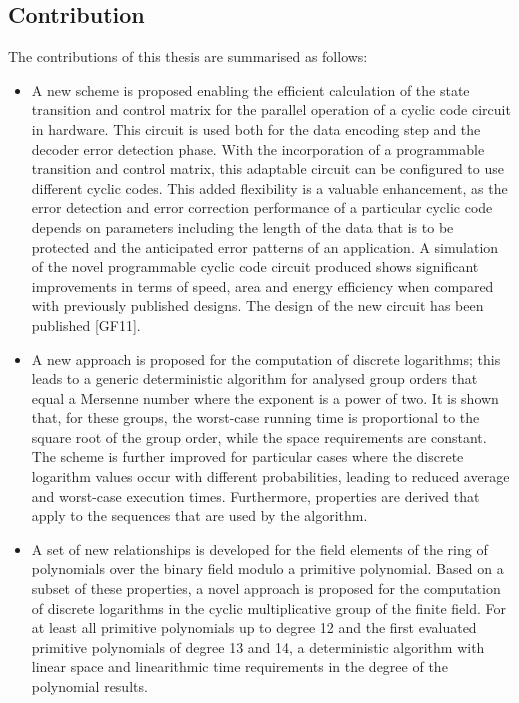 \documentclass[a4paper, 11pt]{article}
\begin{document}
\subsection{Contribution}
The contributions of this thesis are summarised as follows:

\begin{itemize}
\item A new scheme is proposed enabling the efficient calculation of the state transition and control matrix for the parallel operation of a cyclic code circuit in hardware. This circuit is used both for the data encoding step and the decoder error detection phase. With the incorporation of a programmable transition and control matrix, this adaptable circuit can be configured to use different cyclic codes. This added flexibility is a valuable enhancement, as the error detection and error correction performance of a particular cyclic code depends on parameters including the length of the data that is to be protected and the anticipated error patterns of an application. A simulation of the novel programmable cyclic code circuit produced shows significant improvements in terms of speed, area and energy efficiency when compared with previously published designs. The design of the new circuit has been published [GF11].
\item A new approach is proposed for the computation of discrete logarithms; this leads to a generic deterministic algorithm for analysed group orders that equal a Mersenne number where the exponent is a power of two. It is shown that, for these groups, the worst-case running time is proportional to the square root of the group order, while the space requirements are constant. The scheme is further improved for particular cases where the discrete logarithm values occur with different probabilities, leading to reduced average and worst-case execution times. Furthermore, properties are derived that apply to the sequences that are used by the algorithm.
\item A set of new relationships is developed for the field elements of the ring of polynomials over the binary field modulo a primitive polynomial. Based on a subset of these properties, a novel approach is proposed for the computation of discrete logarithms in the cyclic multiplicative group of the finite field. For at least all primitive polynomials up to degree 12 and the first evaluated primitive polynomials of degree 13 and 14, a deterministic algorithm with linear space and linearithmic time requirements in the degree of the polynomial results.
\end{itemize}
\end{document}

